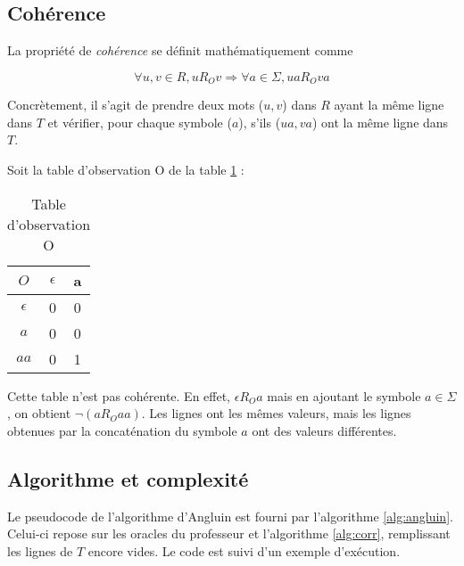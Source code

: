 \subsection{Cohérence}\label{angluin:coh}

La propriété de \emph{cohérence} se définit mathématiquement comme

$$ \forall u,v \in R, u R_O v \Rightarrow \forall a \in \Sigma, ua R_O va$$

Concrètement, il s'agit de prendre deux mots ($u,v$) dans $R$ ayant la même ligne dans $T$ et vérifier, pour chaque symbole ($a$), s'ils ($ua,va$) ont la même ligne dans $T$.

\begin{example}
	Soit la table d'observation O de la table \ref{tab:Oex} :

	\begin{table}[H]
		\centering
	\begin{tabular}{|c|c|c|}
		\hline
		$O$ & $\epsilon$ & a\\
		\hline
		$\epsilon$ & 0 & 0\\
		$a$ & 0 & 0\\
		\hline
		$aa$ & 0 & 1\\
		\hline
	\end{tabular}\caption{Table d'observation O}\label{tab:Oex}
\end{table}
	\vspace{0.5cm}
	Cette table n'est pas cohérente. En effet, $\epsilon R_O a$ mais en ajoutant le symbole $a\in \Sigma$, on obtient $\neg (a R_O aa)$. Les lignes ont les mêmes valeurs, mais les lignes obtenues par la concaténation du symbole $a$ ont des valeurs différentes.
\end{example}


\subsection{Algorithme et complexité}\label{angluin:algo}


Le pseudocode de l'algorithme d'Angluin est fourni par l'algorithme \ref{alg:angluin}\cite{Neider14}. Celui-ci repose sur les oracles du professeur et l'algorithme \ref{alg:corr}, remplissant les lignes de $T$ encore vides. Le code est suivi d'un exemple d'exécution.

